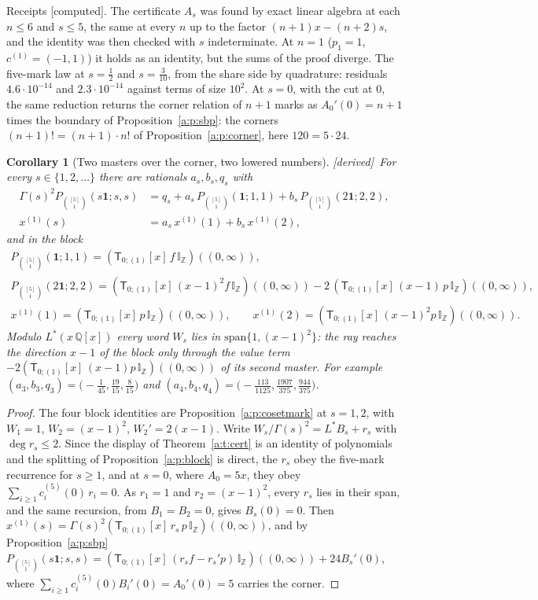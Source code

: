\documentclass[11pt]{article}
\newcommand{\one}{\mathbf 1}
\newcommand{\sT}{\mathsf T}
\newcommand{\IZ}{\mathbb I_{\mathbb Z}}
\newcommand{\Tx}[3]{(\sT_{#1;(1)}[x]\,#2)((#3,\infty))}
\theoremstyle{plain}
\newtheorem{corollary}[proposition]{Corollary}
\theoremstyle{definition}
\theoremstyle{remark}
\newcommand{\derived}{\textup{[derived]}}
\newcommand{\computed}{\textup{[computed]}}
\begin{document}
\noindent Receipts \computed. The certificate $A_s$ was found by exact linear algebra at each $n\le6$ and $s\le5$, the same at every $n$ up to the factor $(n+1)x-(n+2)s$, and the identity was then checked with $s$ indeterminate. At $n=1$ ($p_1=1$, $c^{(1)}=(-1,1)$) it holds as an identity, but the sums of the proof diverge. The five-mark law at $s=\frac12$ and $s=\frac3{10}$, from the share side by quadrature: residuals $4.6\cdot10^{-14}$ and $2.3\cdot10^{-14}$ against terms of size $10^2$. At $s=0$, with the cut at $0$, the same reduction returns the corner relation of $n+1$ marks as $A_0'(0)=n+1$ times the boundary of Proposition~\ref{a:p:sbp}: the corners $(n+1)!=(n+1)\cdot n!$ of Proposition~\ref{a:p:corner}, here $120=5\cdot24$.

\begin{corollary}[Two masters over the corner, two lowered numbers]\label{a:c:masters}\derived\
For every $s\in\{1,2,\dots\}$ there are rationals $a_s,b_s,q_s$ with
\begin{align*}
\Gamma(s)^2P_{\binom{[5]}1}(s\one;s,s)&=q_s+a_s\,P_{\binom{[5]}1}(\one;1,1)+b_s\,P_{\binom{[5]}1}(2\one;2,2),\\
x^{(1)}(s)&=a_s\,x^{(1)}(1)+b_s\,x^{(1)}(2),
\end{align*}
and in the block
\begin{gather*}
P_{\binom{[5]}1}(\one;1,1)=\Tx{0}{f\,\IZ}{0},\\
P_{\binom{[5]}1}(2\one;2,2)=\Tx{0}{(x-1)^2f\,\IZ}{0}-2\,\Tx{0}{(x-1)\,p\,\IZ}{0},\\
x^{(1)}(1)=\Tx{0}{p\,\IZ}{0},\qquad x^{(1)}(2)=\Tx{0}{(x-1)^2p\,\IZ}{0}.
\end{gather*}
Modulo $L^\ast(x\,\mathbb Q[x])$ every word $W_s$ lies in $\mathrm{span}\{1,(x-1)^2\}$: the ray reaches the direction $x-1$ of the block only through the value term $-2\Tx{0}{(x-1)p\,\IZ}{0}$ of its second master. For example $(a_3,b_3,q_3)=\big(-\frac1{45},\frac{19}{15},\frac8{15}\big)$ and $(a_4,b_4,q_4)=\big(-\frac{113}{1125},\frac{1907}{375},\frac{944}{375}\big)$.
\end{corollary}

\begin{proof}
The four block identities are Proposition~\ref{a:p:cosetmark} at $s=1,2$, with $W_1=1$, $W_2=(x-1)^2$, $W_2'=2(x-1)$. Write $W_s/\Gamma(s)^2=L^\ast B_s+r_s$ with $\deg r_s\le2$. Since the display of Theorem~\ref{a:t:cert} is an identity of polynomials and the splitting of Proposition~\ref{a:p:block} is direct, the $r_s$ obey the five-mark recurrence for $s\ge1$, and at $s=0$, where $A_0=5x$, they obey $\sum_{i\ge1}c^{(5)}_i(0)\,r_i=0$. As $r_1=1$ and $r_2=(x-1)^2$, every $r_s$ lies in their span, and the same recursion, from $B_1=B_2=0$, gives $B_s(0)=0$. Then $x^{(1)}(s)=\Gamma(s)^2\Tx{0}{r_s\,p\,\IZ}{0}$, and by Proposition~\ref{a:p:sbp} $P_{\binom{[5]}1}(s\one;s,s)=\Tx{0}{(r_sf-r_s'p)\,\IZ}{0}+24B_s'(0)$, where $\sum_{i\ge1}c^{(5)}_i(0)B_i'(0)=A_0'(0)=5$ carries the corner.
\end{proof}
\end{document}
